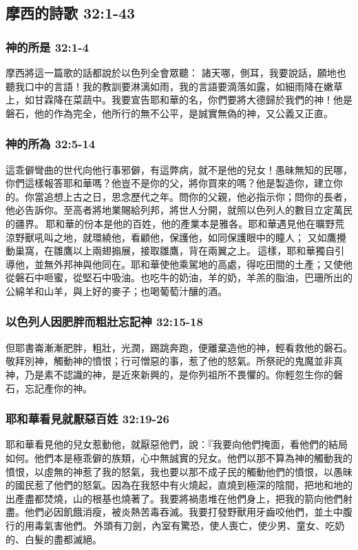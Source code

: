 \subsection{摩西的詩歌 32:1-43 }
\subsubsection{神的所是 32:1-4}
摩西將這一篇歌的話都說於以色列全會眾聽：
諸天哪，側耳，我要說話，願地也聽我口中的言語！我的教訓要淋漓如雨，我的言語要滴落如露，如細雨降在嫩草上，如甘霖降在菜蔬中。我要宣告耶和華的名，你們要將大德歸於我們的神！他是磐石，他的作為完全，他所行的無不公平，是誠實無偽的神，又公義又正直。 

\subsubsection{神的所為 32:5-14}
這乖僻彎曲的世代向他行事邪僻，有這弊病，就不是他的兒女！愚昧無知的民哪，你們這樣報答耶和華嗎？他豈不是你的父，將你買來的嗎？他是製造你，建立你的。你當追想上古之日，思念歷代之年。問你的父親，他必指示你；問你的長者，他必告訴你。至高者將地業賜給列邦，將世人分開，就照以色列人的數目立定萬民的疆界。 耶和華的份本是他的百姓，他的產業本是雅各。耶和華遇見他在曠野荒涼野獸吼叫之地，就環繞他，看顧他，保護他，如同保護眼中的瞳人； 又如鷹攪動巢窩，在雛鷹以上兩翅搧展，接取雛鷹，背在兩翼之上。 這樣，耶和華獨自引導他，並無外邦神與他同在。耶和華使他乘駕地的高處，得吃田間的土產；又使他從磐石中咂蜜，從堅石中吸油。也吃牛的奶油，羊的奶，羊羔的脂油，巴珊所出的公綿羊和山羊，與上好的麥子；也喝葡萄汁釀的酒。

\subsubsection{以色列人因肥胖而粗壯忘記神 32:15-18}
但耶書崙漸漸肥胖，粗壯，光潤，踢跳奔跑，便離棄造他的神，輕看救他的磐石。敬拜別神，觸動神的憤恨；行可憎惡的事，惹了他的怒氣。所祭祀的鬼魔並非真神，乃是素不認識的神，是近來新興的，是你列祖所不畏懼的。你輕忽生你的磐石，忘記產你的神。 

\subsubsection{耶和華看見就厭惡百姓 32:19-26}
耶和華看見他的兒女惹動他，就厭惡他們，說：『我要向他們掩面，看他們的結局如何。他們本是極乖僻的族類，心中無誠實的兒女。他們以那不算為神的觸動我的憤恨，以虛無的神惹了我的怒氣，我也要以那不成子民的觸動他們的憤恨，以愚昧的國民惹了他們的怒氣。因為在我怒中有火燒起，直燒到極深的陰間，把地和地的出產盡都焚燒，山的根基也燒著了。我要將禍患堆在他們身上，把我的箭向他們射盡。他們必因飢餓消瘦，被炎熱苦毒吞滅。我要打發野獸用牙齒咬他們，並土中腹行的用毒氣害他們。 外頭有刀劍，內室有驚恐，使人喪亡，使少男、童女、吃奶的、白髮的盡都滅絕。

